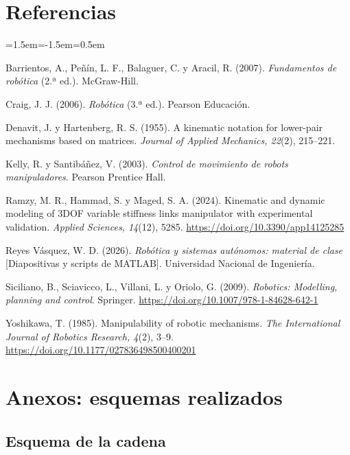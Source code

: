 \documentclass[11pt,a4paper]{article}
\begin{document}
\section*{Referencias}

\begin{list}{}{\leftmargin=1.5em\itemindent=-1.5em\itemsep=0.5em}
\item Barrientos, A., Peñín, L. F., Balaguer, C. y Aracil, R. (2007). \emph{Fundamentos de robótica} (2.ª ed.). McGraw-Hill.
\item Craig, J. J. (2006). \emph{Robótica} (3.ª ed.). Pearson Educación.
\item Denavit, J. y Hartenberg, R. S. (1955). A kinematic notation for lower-pair mechanisms based on matrices. \emph{Journal of Applied Mechanics, 22}(2), 215--221.
\item Kelly, R. y Santibáñez, V. (2003). \emph{Control de movimiento de robots manipuladores}. Pearson Prentice Hall.
\item Ramzy, M. R., Hammad, S. y Maged, S. A. (2024). Kinematic and dynamic modeling of 3DOF variable stiffness links manipulator with experimental validation. \emph{Applied Sciences, 14}(12), 5285. \url{https://doi.org/10.3390/app14125285}
\item Reyes Vásquez, W. D. (2026). \emph{Robótica y sistemas autónomos: material de clase} [Diapositivas y scripts de MATLAB]. Universidad Nacional de Ingeniería.
\item Siciliano, B., Sciavicco, L., Villani, L. y Oriolo, G. (2009). \emph{Robotics: Modelling, planning and control}. Springer. \url{https://doi.org/10.1007/978-1-84628-642-1}
\item Yoshikawa, T. (1985). Manipulability of robotic mechanisms. \emph{The International Journal of Robotics Research, 4}(2), 3--9. \url{https://doi.org/10.1177/027836498500400201}
\end{list}

\appendix
\section{Anexos: esquemas realizados}

\subsection{Esquema de la cadena}
\end{document}
